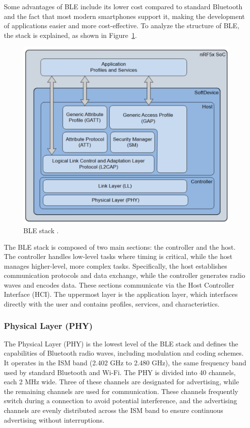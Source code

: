 \documentclass{Configuration_Files/PoliMi3i_thesis}
\begin{document}
Some advantages of BLE include its lower cost compared to standard Bluetooth and the fact that most modern smartphones support it, making the development of applications easier and more cost-effective. To analyze the structure of BLE, the stack is explained, as shown in Figure~\ref{fig:ble_stack}.

\begin{figure}[h]
    \centering
    \includegraphics[width=\linewidth]{Bluetooth Low Energy/Screenshot 2024-08-15 at 23.25.52.png}
    \caption{BLE stack \cite{nordic_stack}.}
    \label{fig:ble_stack}
\end{figure}

The BLE stack is composed of two main sections: the controller and the host. The controller handles low-level tasks where timing is critical, while the host manages higher-level, more complex tasks. Specifically, the host establishes communication protocols and data exchange, while the controller generates radio waves and encodes data. These sections communicate via the Host Controller Interface (HCI). The uppermost layer is the application layer, which interfaces directly with the user and contains profiles, services, and characteristics.

\subsubsection{Physical Layer (PHY)}
The Physical Layer (PHY) is the lowest level of the BLE stack and defines the capabilities of Bluetooth radio waves, including modulation and coding schemes. It operates in the ISM band (2.402 GHz to 2.480 GHz), the same frequency band used by standard Bluetooth and Wi-Fi. The PHY is divided into 40 channels, each 2 MHz wide. Three of these channels are designated for advertising, while the remaining channels are used for communication. These channels frequently switch during a connection to avoid potential interference, and the advertising channels are evenly distributed across the ISM band to ensure continuous advertising without interruptions.
\end{document}
